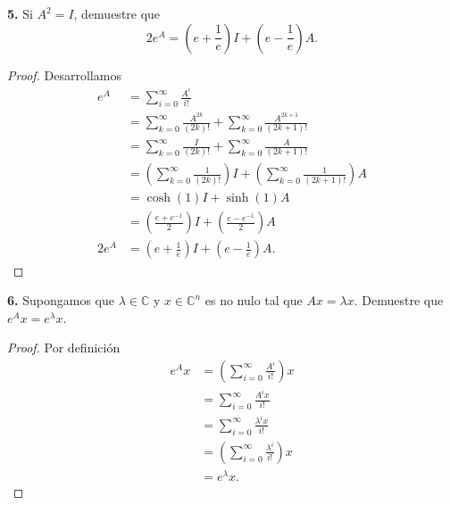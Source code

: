 \documentclass{article}
\newenvironment{statement}[1]{\smallskip\noindent\color[rgb]{1.00,0.00,0.50} {\bf #1.}}{}
\theoremstyle{definition}
\theoremstyle{remark}
\newcommand{\BC}{\mathbb C}
\begin{document}
\begin{statement}{5}
  Si $A^2 = I$, demuestre que
  \[
    2 e^A = (e + \frac{1}{e}) I + (e - \frac{1}{e}) A.
  \]
\end{statement}

\begin{proof}
  Desarrollamos
  \begin{align*}
    e^A &= \sum_{i = 0}^{\infty} \frac{A^i}{i!}\\
    &= \sum_{k = 0}^{\infty} \frac{A^{2k}}{(2k)!} + \sum_{k = 0}^{\infty} \frac{A^{2k + 1}}{(2k + 1)!}\\
    &= \sum_{k = 0}^{\infty} \frac{I}{(2k)!} + \sum_{k = 0}^{\infty} \frac{A}{(2k + 1)!}\\
    &= \left(\sum_{k = 0}^{\infty} \frac{1}{(2k)!}\right) I + \left(\sum_{k = 0}^{\infty} \frac{1}{(2k + 1)!}\right) A\\
    &= \cosh(1) I + \sinh(1) A\\
    &= \left(\frac{e + e^{-1}}{2}\right) I + \left(\frac{e - e^{-1}}{2}\right) A\\
    2 e^A &= \left(e + \frac{1}{e}\right) I + \left(e - \frac{1}{e}\right) A.
  \end{align*}
\end{proof}

\begin{statement}{6}
  Supongamos que $\lambda \in \BC$ y $x \in \BC^n$ es no nulo tal que $Ax = \lambda x$.
  Demuestre que $e^A x = e^{\lambda} x$.
\end{statement}

\begin{proof}
  Por definici\'on
  \begin{align*}
    e^A x &= \left(\sum_{i = 0}^{\infty} \frac{A^i}{i!}\right) x\\
    &= \sum_{i = 0}^{\infty} \frac{A^i x}{i!}\\
    &= \sum_{i = 0}^{\infty} \frac{\lambda^i x}{i!}\\
    &= \left(\sum_{i = 0}^{\infty} \frac{\lambda^i}{i!}\right) x\\
    &= e^{\lambda} x.
  \end{align*}
\end{proof}
\end{document}
